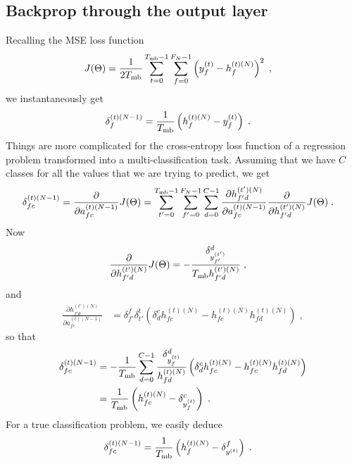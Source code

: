 \begin{subappendices}
\section{Backprop through the output layer} \label{sec:appenbpoutput}

Recalling the MSE loss function
\begin{align}
J(\Theta)&=\frac{1}{2T_{{\rm mb}}}\sum_{t=0}^{T_{{\rm mb}}-1}\sum_{f=0}^{F_N-1}
%
\left(y_f^{(t)}-h_{f}^{(t)(N)}\right)^2\;,
\end{align}
we instantaneously get
\begin{align}
\delta^{(t)(N-1)}_f&= \frac{1}{T_{{\rm mb}}}\left(h_{f}^{(t)(N)}-y_f^{(t)}\right)\;.
\end{align}
Things are more complicated for the cross-entropy loss function of a regression problem transformed into a multi-classification task.
Assuming that we have $C$ classes for all the values that we are trying to predict, we get
\begin{align}
\delta^{(t)(N-1)}_{fc}&= \frac{\partial }{\partial  a_{fc}^{(t)(N-1)}}J(\Theta)
%
=\sum_{t'=0}^{T_{{\rm mb}}-1}\sum_{f'=0}^{F_N-1}\sum_{d=0}^{C-1}
%
\frac{\partial  h_{f'd}^{(t')(N)}}{\partial  a_{fc}^{(t)(N-1)}}
%
 \frac{\partial }{\partial  h_{f'd}^{(t')(N)}}J(\Theta)\;.
\end{align}
Now
\begin{align}
 \frac{\partial }{\partial  h_{f'd}^{(t')(N)}}J(\Theta)&=-\frac{\delta^{d}_{ y_{f'}^{(t')}}}{T_{{\rm mb}} h_{f'd}^{(t')(N)}}\;,
\end{align}
and
\begin{align}
\frac{\partial  h_{f'd}^{(t')(N)}}{\partial  a_{fc}^{(t)(N-1)}}&=
%
\delta^f_{f'}\delta^{t}_{t'} \left(\delta^c_d h_{fc}^{(t)(N)}- h_{fc}^{(t)(N)} h_{fd}^{(t)(N)}\right)\;,
\end{align}
so that
\begin{align}
\delta^{(t)(N-1)}_{fc}&=-\frac{1}{T_{{\rm mb}}} \sum_{d=0}^{C-1}\frac{\delta^{d}_{ y_f^{(t)}}}{h_{fd}^{(t)(N)}}
%
\left(\delta^c_d h_{fc}^{(t)(N)}- h_{fc}^{(t)(N)} h_{fd}^{(t)(N)}\right)\notag\\
%
&=\frac{1}{T_{{\rm mb}}}\left( h_{fc}^{(t)(N)}-\delta^{c}_{ y_f^{(t)}}\right)\;.
\end{align}
For a true classification problem, we easily deduce
\begin{align}
\delta^{(t)(N-1)}_{fc}&=\frac{1}{T_{{\rm mb}}}\left( h_{f}^{(t)(N)}-\delta^{f}_{ y^{(t)}}\right)\;.
\end{align}


\end{subappendices}
